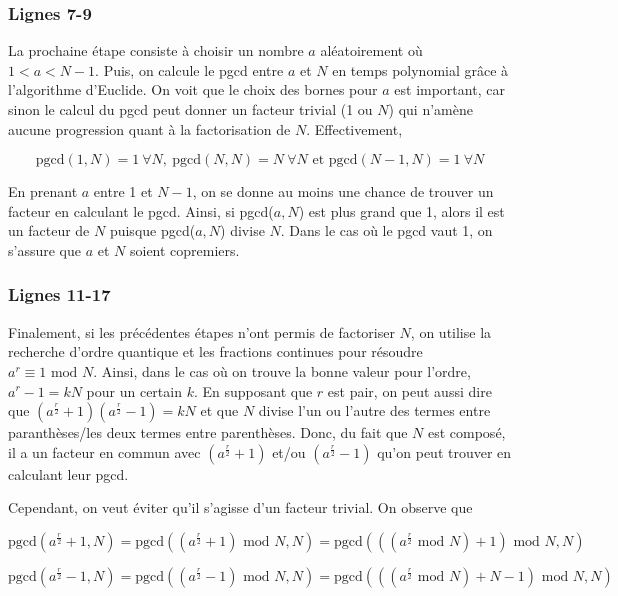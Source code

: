 \subsubsection*{Lignes 7-9}
La prochaine étape consiste à choisir un nombre $a$ aléatoirement où $1 < a < N-1$. Puis, on calcule le pgcd entre $a$ et $N$ en temps polynomial grâce à l'algorithme d'Euclide. On voit que le choix des bornes pour $a$ est important, car sinon le calcul du pgcd peut donner un facteur trivial (1 ou $N$) qui n'amène aucune progression quant à la factorisation de $N$. Effectivement,

\begin{equation*}
    \text{pgcd}(1,N) = 1 \ \forall N, \ \text{pgcd}(N,N) = N \ \forall N \text{ et } \text{pgcd}(N-1, N) = 1 \ \forall N 
\end{equation*}

En prenant $a$ entre 1 et $N-1$, on se donne au moins une chance de trouver un facteur en calculant le pgcd. Ainsi, si pgcd($a,N$) est plus grand que 1, alors il est un facteur de $N$ puisque pgcd($a,N$) divise $N$. Dans le cas où le pgcd vaut 1, on s'assure que $a$ et $N$ soient copremiers.

\subsubsection*{Lignes 11-17}
Finalement, si les précédentes étapes n'ont permis de factoriser $N$, on utilise la recherche d'ordre quantique et les fractions continues pour résoudre $a^r \equiv 1 \text{ mod } N$. Ainsi, dans le cas où on trouve la bonne valeur pour l'ordre, $a^r - 1 = kN$ pour un certain $k$. En supposant que $r$ est pair, on peut aussi dire que $(a^{\frac{r}{2}} + 1)(a^{\frac{r}{2}} - 1) = kN$ et que $N$ divise l'un ou l'autre des termes entre paranthèses/les deux termes entre parenthèses. Donc, du fait que $N$ est composé, il a un facteur en commun avec $(a^{\frac{r}{2}} + 1)$ et/ou $(a^{\frac{r}{2}} - 1)$ qu'on peut trouver en calculant leur pgcd. 

Cependant, on veut éviter qu'il s'agisse d'un facteur trivial. On observe que 

\begin{equation*}
    \text{pgcd}(a^{\frac{r}{2}} + 1, N) = \text{pgcd}\left((a^{\frac{r}{2}} + 1) \text{ mod } N, N\right) = \text{pgcd}\left(((a^{\frac{r}{2}} \text{ mod } N) + 1) \text{ mod } N, N\right)
\end{equation*}

\begin{equation*}
    \text{pgcd}(a^{\frac{r}{2}} - 1, N) = \text{pgcd}\left((a^{\frac{r}{2}} - 1) \text{ mod } N, N\right) = \text{pgcd}\left(((a^{\frac{r}{2}} \text{ mod } N) + N - 1) \text{ mod } N, N\right)
\end{equation*}

